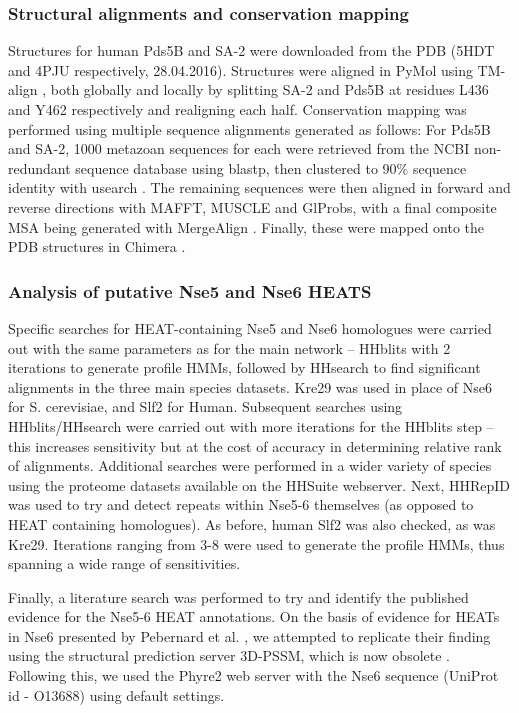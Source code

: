 \documentclass[a4paper,11pt,twoside,openright]{scrbook}
\begin{document}
\subsubsection{Structural alignments and conservation mapping}
Structures for human Pds5B and SA-2 were downloaded from the PDB (5HDT
\cite{Ouyang2016} and 4PJU \cite{Hara2014} respectively, 28.04.2016). Structures
were aligned in PyMol using TM-align \cite{PyMol2016,Zhang2005}, both globally
and locally by splitting SA-2 and Pds5B at residues L436 and Y462 respectively
and realigning each half. Conservation mapping was performed using multiple
sequence alignments generated as follows: For Pds5B and SA-2, 1000 metazoan
sequences for each were retrieved from the NCBI non-redundant sequence database
using blastp, then clustered to 90\% sequence identity with usearch
\cite{Altschul1990,Edgar2010}. The remaining sequences were then aligned in
forward and reverse directions with MAFFT, MUSCLE and GlProbs, with a final
composite MSA being generated with MergeAlign
\cite{Katoh2002,Edgar2004,Ye2015,Collingridge2012}. Finally, these were mapped
onto the PDB structures in Chimera \cite{Pettersen2004}.

\subsubsection{Analysis of putative Nse5 and Nse6 HEATS}
Specific searches for HEAT-containing Nse5 and Nse6 homologues were carried out
with the same parameters as for the main network – HHblits with 2 iterations to
generate profile HMMs, followed by HHsearch to find significant alignments in
the three main species datasets. Kre29 was used in place of Nse6 for S.
cerevisiae, and Slf2 for Human. Subsequent searches using HHblits/HHsearch were
carried out with more iterations for the HHblits step – this increases
sensitivity but at the cost of accuracy in determining relative rank of
alignments. Additional searches were performed in a wider variety of species
using the proteome datasets available on the HHSuite webserver. Next, HHRepID
\cite{Biegert2008} was used to try and detect repeats within Nse5-6 themselves
(as opposed to HEAT containing homologues). As before, human Slf2 was also
checked, as was Kre29. Iterations ranging from 3-8 were used to generate the
profile HMMs, thus spanning a wide range of sensitivities.

Finally, a literature search was performed to try and identify the published
evidence for the Nse5-6 HEAT annotations. On the basis of evidence for HEATs in
Nse6 presented by Pebernard et al. \cite{Pebernard2006}, we attempted to
replicate their finding using the structural prediction server 3D-PSSM, which is
now obsolete \cite{Kelley2000}. Following this, we used the Phyre2 web server
\cite{Kelley2015} with the Nse6 sequence (UniProt id - O13688) using default
settings.
\end{document}
